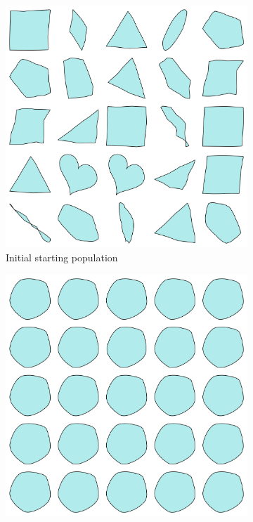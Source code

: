 \documentclass{article}
\begin{document}
\begin{figure}[H]
    \centering
    \begin{subfigure}[b]{0.32\textwidth}
        \centering
        \includegraphics[width=\textwidth]{figures/GAResults/GA17/50_init_pop.png}
        \caption{Initial starting population}
        \label{fig:GA17_starting}
    \end{subfigure}
    \hfill
    \begin{subfigure}[b]{0.32\textwidth}
        \centering
        \includegraphics[width=\textwidth]{figures/GAResults/GA17/latent/final_generation.png}

\end{subfigure}
\end{figure}
\end{document}
